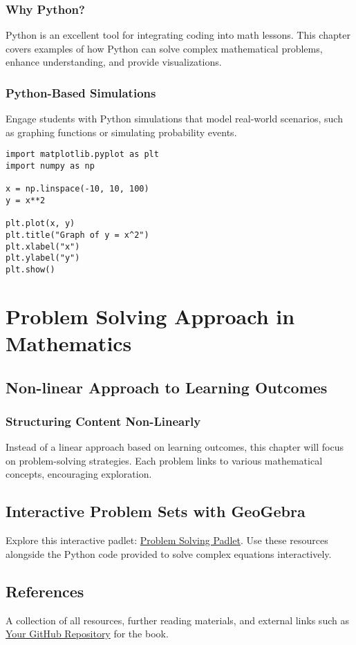 \documentclass[12pt, a4paper]{memoir}
\begin{document}
\section{Why Python?}
Python is an excellent tool for integrating coding into math lessons. This chapter covers examples of how Python can solve complex mathematical problems, enhance understanding, and provide visualizations.

\section{Python-Based Simulations}
Engage students with Python simulations that model real-world scenarios, such as graphing functions or simulating probability events.

\begin{verbatim}
import matplotlib.pyplot as plt
import numpy as np

x = np.linspace(-10, 10, 100)
y = x**2

plt.plot(x, y)
plt.title("Graph of y = x^2")
plt.xlabel("x")
plt.ylabel("y")
plt.show()
\end{verbatim}

\part{Problem Solving Approach in Mathematics}

\chapter{Non-linear Approach to Learning Outcomes}
\section{Structuring Content Non-Linearly}
Instead of a linear approach based on learning outcomes, this chapter will focus on problem-solving strategies. Each problem links to various mathematical concepts, encouraging exploration.

\chapter{Interactive Problem Sets with GeoGebra}
Explore this interactive padlet: \href{https://padlet.com/yourpadletlink}{Problem Solving Padlet}. Use these resources alongside the Python code provided to solve complex equations interactively.

\backmatter
\chapter{References}
A collection of all resources, further reading materials, and external links such as \href{https://github.com/YourGithubRepo}{Your GitHub Repository} for the book.
\end{document}
